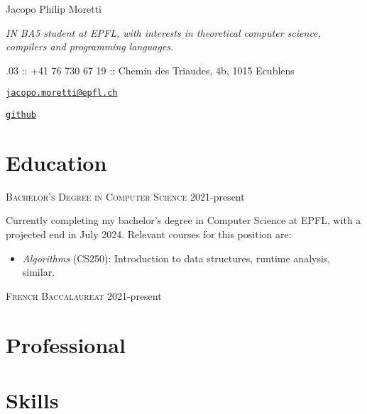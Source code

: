 \documentclass[10pt]{article}
\renewcommand{\url}[1]{{\texttt{#1}}}
\renewcommand{\line}[2]{{\large \noindent\textsc{#1} \hfill #2}}
\begin{document}
  \begin{center}
    \huge Jacopo Philip Moretti
  \end{center}

  \begin{adjustwidth}{1in}{1in}
    \textit{IN BA5 student at EPFL, with interests in theoretical computer science, compilers and programming languages.}

    .03 :: +41 76 730 67 19 :: Chemin des Triaudes, 4b, 1015 Ecublens

    \noindent \href{https://people.epfl.ch/jacopo.moretti}{\url{jacopo.moretti@epfl.ch}}

    \noindent \href{https://github.com/quartztz}{\url{github}}
  \end{adjustwidth}

  \section*{Education}

  \line{Bachelor's Degree in Computer Science}{2021-present}

  Currently completing my bachelor's degree in Computer Science at EPFL, with a projected end in July 2024. Relevant courses for this position are: 
  \begin{itemize}
    \item \textit{Algorithms} (CS250): Introduction to data structures, runtime analysis, similar. 
  \end{itemize}

  \line{French Baccalaureat}{2021-present}
  
  \section*{Professional}

  \section*{Skills}
\end{document}
